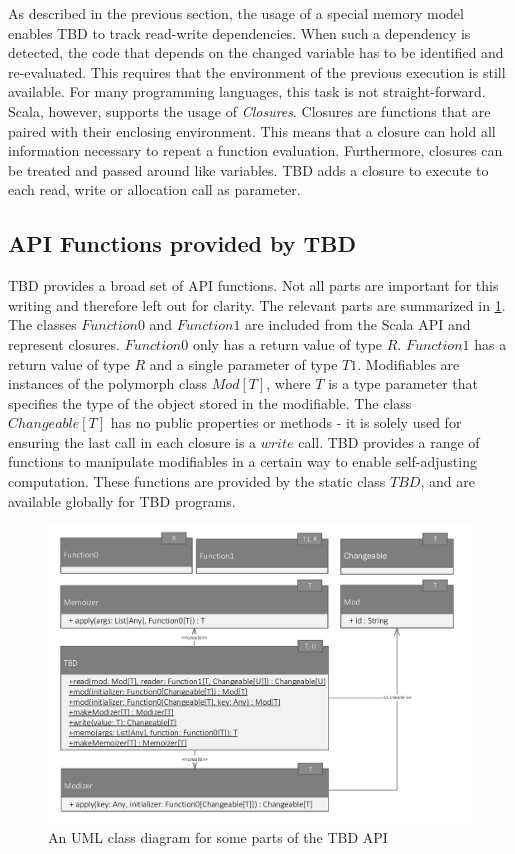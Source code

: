 As described in the previous section, the usage of a special memory model enables TBD to track read-write dependencies. When such a dependency is detected, the code that depends on the changed variable has to be identified and re-evaluated. This requires that the environment of the previous execution is still available. For many programming languages, this task is not straight-forward. Scala, however, supports the usage of \textit{Closures}. Closures are functions that are paired with their enclosing environment. This means that a closure can hold all information necessary to repeat a function evaluation. Furthermore, closures can be treated and passed around like variables. TBD adds a closure to execute to each read, write or allocation call as parameter.

\subsection{API Functions provided by TBD} 

TBD provides a broad set of API functions. Not all parts are important for this writing and therefore left out for clarity. The relevant parts are summarized in \ref{fig:tbd_uml}. The classes $Function0$ and $Function1$ are included from the Scala API and represent closures. $Function0$ only has a return value of type $R$. $Function1$ has a return value of type $R$ and a single parameter of type $T1$. Modifiables are instances of the polymorph class $Mod[T]$, where $T$ is a type parameter that specifies the type of the object stored in the modifiable. The class $Changeable[T]$ has no public properties or methods - it is solely used for ensuring the last call in each closure is a $write$ call. TBD provides a range of functions to manipulate modifiables in a certain way to enable self-adjusting computation. These functions are provided by the static class $TBD$, and are available globally for TBD programs. 
\begin{figure}
\begin{center}
\includegraphics[scale=0.7]{uml/TBD.pdf}
\end{center}
\caption{An UML class diagram for some parts of the TBD API}
\label{fig:tbd_uml}
\end{figure}

